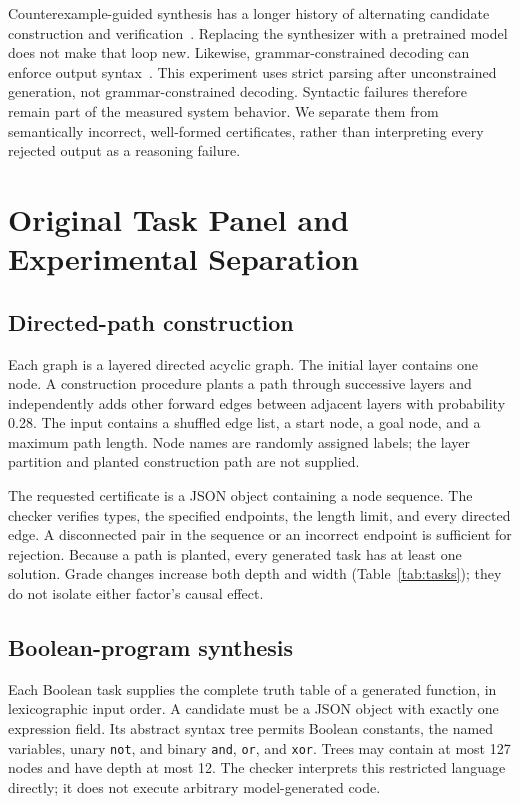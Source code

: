 Counterexample-guided synthesis has a longer history of alternating candidate construction and verification~\cite{solarlezama2008sketching}. Replacing the synthesizer with a pretrained model does not make that loop new. Likewise, grammar-constrained decoding can enforce output syntax~\cite{park2025grammar}. This experiment uses strict parsing after unconstrained generation, not grammar-constrained decoding. Syntactic failures therefore remain part of the measured system behavior. We separate them from semantically incorrect, well-formed certificates, rather than interpreting every rejected output as a reasoning failure.

\section{Original Task Panel and Experimental Separation}
\label{sec:tasks}

\subsection{Directed-path construction}

Each graph is a layered directed acyclic graph. The initial layer contains one node. A construction procedure plants a path through successive layers and independently adds other forward edges between adjacent layers with probability 0.28. The input contains a shuffled edge list, a start node, a goal node, and a maximum path length. Node names are randomly assigned labels; the layer partition and planted construction path are not supplied.

The requested certificate is a JSON object containing a node sequence. The checker verifies types, the specified endpoints, the length limit, and every directed edge. A disconnected pair in the sequence or an incorrect endpoint is sufficient for rejection. Because a path is planted, every generated task has at least one solution. Grade changes increase both depth and width (Table~\ref{tab:tasks}); they do not isolate either factor's causal effect.

\subsection{Boolean-program synthesis}

Each Boolean task supplies the complete truth table of a generated function, in lexicographic input order. A candidate must be a JSON object with exactly one expression field. Its abstract syntax tree permits Boolean constants, the named variables, unary \texttt{not}, and binary \texttt{and}, \texttt{or}, and \texttt{xor}. Trees may contain at most 127 nodes and have depth at most 12. The checker interprets this restricted language directly; it does not execute arbitrary model-generated code.

